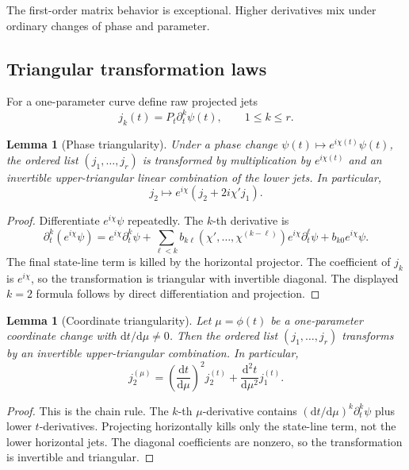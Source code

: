 \documentclass[11pt]{amsart}
\newtheorem{lemma}[theorem]{Lemma}
\newcommand{\dd}{\mathrm d}
\begin{document}
The first-order matrix behavior is exceptional. Higher derivatives mix under
ordinary changes of phase and parameter.

\subsection{Triangular transformation laws}

For a one-parameter curve define raw projected jets
\[
        j_k(t)=P_t\partial_t^k\psi(t),\qquad 1\le k\le r.
\]

\begin{lemma}[Phase triangularity]
Under a phase change \(\psi(t)\mapsto e^{i\chi(t)}\psi(t)\), the ordered list
\((j_1,\ldots,j_r)\) is transformed by multiplication by \(e^{i\chi(t)}\) and
an invertible upper-triangular linear combination of the lower jets. In
particular,
\[
        j_2\mapsto e^{i\chi}(j_2+2i\chi'j_1).
\]
\end{lemma}

\begin{proof}
Differentiate \(e^{i\chi}\psi\) repeatedly. The \(k\)-th derivative is
\[
        \partial_t^k(e^{i\chi}\psi)
        =
        e^{i\chi}\partial_t^k\psi
        +\sum_{\ell<k} b_{k\ell}(\chi',\ldots,\chi^{(k-\ell)})
             e^{i\chi}\partial_t^\ell\psi
        +b_{k0}e^{i\chi}\psi .
\]
The final state-line term is killed by the horizontal projector. The coefficient
of \(j_k\) is \(e^{i\chi}\), so the transformation is triangular with invertible
diagonal. The displayed \(k=2\) formula follows by direct differentiation and
projection.
\end{proof}

\begin{lemma}[Coordinate triangularity]
Let \(\mu=\phi(t)\) be a one-parameter coordinate change with
\(\dd t/\dd\mu\ne0\). Then the ordered list \((j_1,\ldots,j_r)\) transforms by
an invertible upper-triangular combination. In particular,
\[
        j_2^{(\mu)}
        =
        \left(\frac{\dd t}{\dd\mu}\right)^2j_2^{(t)}
        +
        \frac{\dd^2 t}{\dd\mu^2}j_1^{(t)} .
\]
\end{lemma}

\begin{proof}
This is the chain rule. The \(k\)-th \(\mu\)-derivative contains
\((\dd t/\dd\mu)^k\partial_t^k\psi\) plus lower \(t\)-derivatives. Projecting
horizontally kills only the state-line term, not the lower horizontal jets. The
diagonal coefficients are nonzero, so the transformation is invertible and
triangular.
\end{proof}
\end{document}
